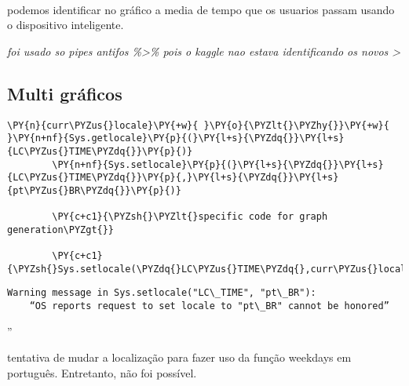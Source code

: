\begin{center}
\end{center}
{ \hspace*{\fill} \\}

podemos identificar no gráfico a media de tempo que os usuarios passam
usando o dispositivo inteligente.

\emph{foi usado so pipes antifos \%\textgreater\% pois o kaggle nao
    estava identificando os novos \textbar\textgreater{}}

\hypertarget{multi-gruxe1ficos}{%
    \subsection{Multi gráficos}\label{multi-gruxe1ficos}}

\begin{tcolorbox}[breakable, size=fbox, boxrule=1pt, pad at break*=1mm,colback=cellbackground, colframe=cellborder]
    \begin{Verbatim}[commandchars=\\\{\}]
        \PY{n}{curr\PYZus{}locale}\PY{+w}{ }\PY{o}{\PYZlt{}\PYZhy{}}\PY{+w}{ }\PY{n+nf}{Sys.getlocale}\PY{p}{(}\PY{l+s}{\PYZdq{}}\PY{l+s}{LC\PYZus{}TIME\PYZdq{}}\PY{p}{)}
        \PY{n+nf}{Sys.setlocale}\PY{p}{(}\PY{l+s}{\PYZdq{}}\PY{l+s}{LC\PYZus{}TIME\PYZdq{}}\PY{p}{,}\PY{l+s}{\PYZdq{}}\PY{l+s}{pt\PYZus{}BR\PYZdq{}}\PY{p}{)}

        \PY{c+c1}{\PYZsh{}\PYZlt{}specific code for graph generation\PYZgt{}}

        \PY{c+c1}{\PYZsh{}Sys.setlocale(\PYZdq{}LC\PYZus{}TIME\PYZdq{},curr\PYZus{}locale)}
    \end{Verbatim}
\end{tcolorbox}

\begin{Verbatim}[commandchars=\\\{\}]
    Warning message in Sys.setlocale("LC\_TIME", "pt\_BR"):
    “OS reports request to set locale to "pt\_BR" cannot be honored”
\end{Verbatim}

''


tentativa de mudar a localização para fazer uso da função weekdays em
português. Entretanto, não foi possível.

